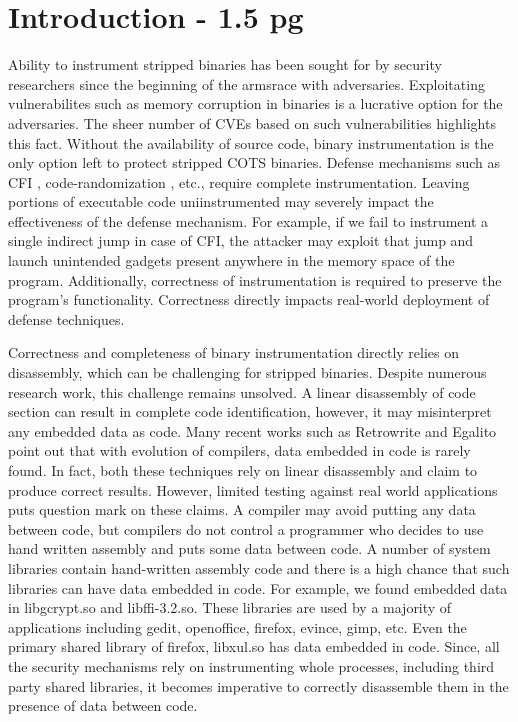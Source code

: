 \section{Introduction - 1.5 pg}

Ability to instrument stripped binaries has been sought for by security
researchers since the beginning of the armsrace with adversaries. Exploitating
vulnerabilites such as memory corruption in binaries is a lucrative option for
the adversaries. The sheer number of CVEs based on such vulnerabilities
highlights this fact. Without the availability of source code, binary
instrumentation is the only option left to protect stripped COTS binaries.
Defense mechanisms such as CFI \cite{}, code-randomization \cite{}, etc.,
require complete instrumentation. Leaving portions of executable code
uniinstrumented may severely impact the effectiveness of the defense mechanism.
For example, if we fail to instrument a single indirect jump in case of CFI, the
attacker may exploit that jump and launch unintended gadgets present anywhere in
the memory space of the program. Additionally, correctness of instrumentation is
required to preserve the program's functionality. Correctness directly impacts
real-world deployment of defense techniques.

Correctness and completeness of binary instrumentation directly relies on
disassembly, which can be challenging for stripped binaries. Despite numerous
research work, this challenge remains unsolved.  A linear disassembly of code
section can result in complete code identification, however, it may misinterpret
any embedded data as code.  Many recent works such as Retrowrite \cite{} and
Egalito \cite{} point out that with evolution of compilers, data embedded in
code is rarely found. In fact, both these techniques rely on linear disassembly
and claim to produce correct results.  However, limited testing against real
world applications puts question mark on these claims. A compiler may avoid
putting any data between code, but compilers do not control a programmer who
decides to use hand written assembly and puts some data between code. A number
of system libraries contain hand-written assembly code and there is a high
chance that such libraries can have data embedded in code. For example, we found
embedded data in libgcrypt.so and libffi-3.2.so. These libraries are used by
a majority of applications including gedit, openoffice, firefox, evince, gimp,
etc. Even the primary shared library of firefox, libxul.so has data embedded in
code. Since, all the security mechanisms rely on instrumenting whole processes,
including third party shared libraries, it becomes imperative to correctly
disassemble them in the presence of data between code.


